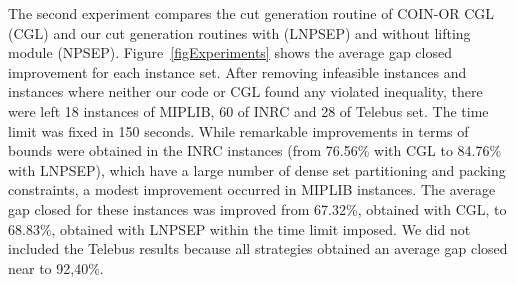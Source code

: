 \documentclass{endm}
\begin{document}
The second experiment compares the cut generation routine of COIN-OR CGL (CGL) and our cut generation routines with (LNPSEP) and without lifting module (NPSEP). Figure~\ref{figExperiments} shows the average gap closed improvement for each instance set. After removing infeasible instances and instances where neither our code or CGL found any violated inequality, there were left 18 instances of MIPLIB, 60 of INRC and 28 of Telebus set. The time limit was fixed in 150 seconds. While remarkable improvements in terms of bounds were obtained in the INRC instances (from 76.56\% with CGL to 84.76\% with LNPSEP), which have a large number of dense set partitioning and packing constraints, a modest improvement occurred in MIPLIB instances. The average gap closed for these instances was improved from 67.32\%, obtained with CGL, to 68.83\%, obtained with LNPSEP within the time limit imposed. We did not included the Telebus results because all strategies obtained an average gap closed near to 92,40\%.
\end{document}
